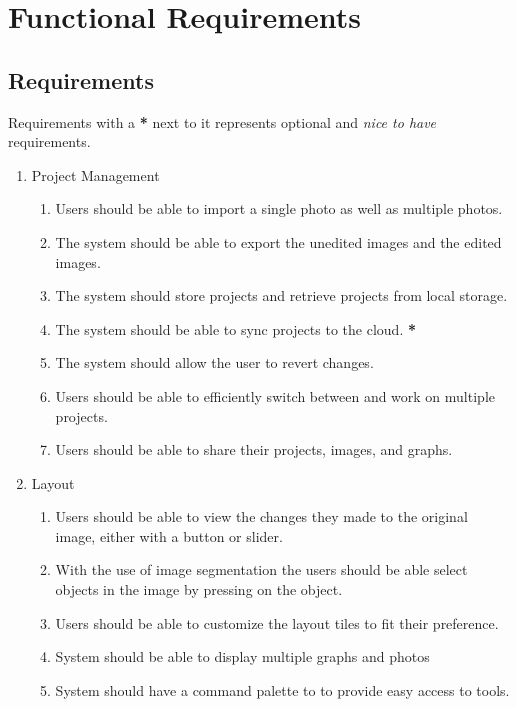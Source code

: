 \documentclass[11pt,a4paper]{article}
\begin{document}
\pagebreak

\section*{Functional Requirements}

\subsection*{Requirements}

Requirements with a \textbf{*} next to it represents optional and \textit{nice
to have} requirements.

\begin{enumerate}[label=\arabic*.]
    \item Project Management
    \begin{enumerate}[label*=\arabic*.]
        \item Users should be able to import a single photo as well as multiple photos. 
        \item The system should be able to export the unedited images and the edited images.
        \item The system should store projects and retrieve projects from local storage.
        \item The system should be able to sync projects to the cloud. \textbf{*}
        \item The system should allow the user to revert changes.
        \item Users should be able to efficiently switch between and work on multiple projects.
        \item Users should be able to share their projects, images, and graphs.
    \end{enumerate}
    
    \item Layout
    \begin{enumerate}[label*=\arabic*.]
        \item Users should be able to view the changes they made to the original image,
        either with a button or slider.
        \item With the use of image segmentation the users should be able select
        objects in the image by pressing on the object.
        \item Users should be able to customize the layout tiles to fit their preference.
        \item System should be able to display multiple graphs and photos
        \item System should have a command palette to to provide easy access to tools.
    \end{enumerate}


\end{enumerate}
\end{document}
